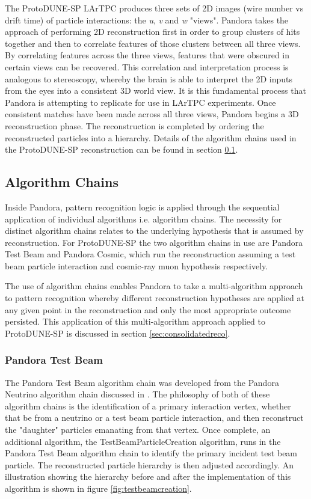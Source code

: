 The ProtoDUNE-SP LArTPC produces three sets of 2D images (wire number vs drift time) of particle interactions: the \textit{u}, \textit{v} and \textit{w} "views".  Pandora takes the approach of performing 2D reconstruction first in order to group clusters of hits together and then to correlate features of those clusters between all three views.  By correlating features across the three views, features that were obscured in certain views can be recovered.  This correlation and interpretation process is analogous to stereoscopy, whereby the brain is able to interpret the 2D inputs from the eyes into a consistent 3D world view.  It is this fundamental process that Pandora is attempting to replicate for use in LArTPC experiments.  Once consistent matches have been made across all three views, Pandora begins a 3D reconstruction phase.  The reconstruction is completed by ordering the reconstructed particles into a hierarchy. Details of the algorithm chains used in the ProtoDUNE-SP reconstruction can be found in section \ref{sec:algchains}.

\subsection{Algorithm Chains}
\label{sec:algchains}
Inside Pandora, pattern recognition logic is applied through the sequential application of individual algorithms i.e. algorithm chains.  The necessity for distinct algorithm chains relates to the underlying hypothesis that is assumed by reconstruction.  For ProtoDUNE-SP the two algorithm chains in use are Pandora Test Beam and Pandora Cosmic, which run the reconstruction assuming a test beam particle interaction and cosmic-ray muon hypothesis respectively.

The use of algorithm chains enables Pandora to take a multi-algorithm approach to pattern recognition whereby different reconstruction hypotheses are applied at any given point in the reconstruction and only the most appropriate outcome persisted.  This application of this multi-algorithm approach applied to ProtoDUNE-SP is discussed in section \ref{sec:consolidatedreco}.

\subsubsection{Pandora Test Beam}
The Pandora Test Beam algorithm chain was developed from the Pandora Neutrino algorithm chain discussed in \cite{pandorauboone}.  The philosophy of both of these algorithm chains is the identification of a primary interaction vertex, whether that be from a neutrino or a test beam particle interaction, and then reconstruct the "daughter" particles emanating from that vertex.  Once complete, an additional algorithm, the TestBeamParticleCreation algorithm, runs in the Pandora Test Beam algorithm chain to identify the primary incident test beam particle.  The reconstructed particle hierarchy is then adjusted accordingly.  An illustration showing the hierarchy before and after the implementation of this algorithm is shown in figure \ref{fig:testbeamcreation}.

